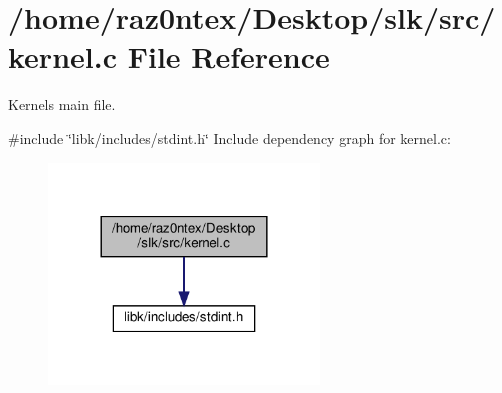 \section{/home/raz0ntex/\+Desktop/slk/src/kernel.c File Reference}
\label{kernel_8c}


Kernel\textquotesingle{}s main file.  


{\ttfamily \#include \char`\"{}libk/includes/stdint.\+h\char`\"{}}\newline
Include dependency graph for kernel.\+c\+:
\nopagebreak
\begin{figure}[H]
\begin{center}
\leavevmode
\includegraphics[width=204pt]{kernel_8c__incl}
\end{center}
\end{figure}
